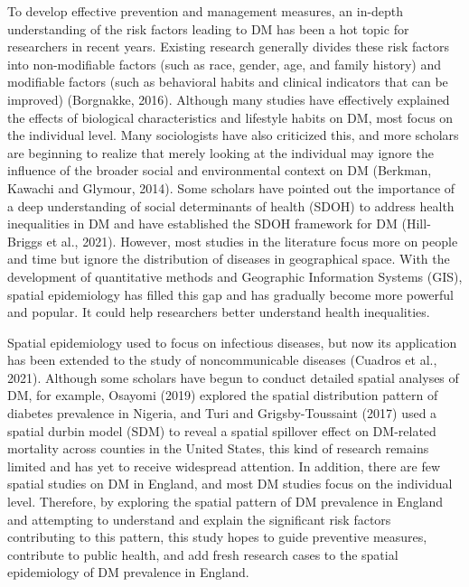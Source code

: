 To develop effective prevention and management measures, an in-depth understanding of the risk factors leading to DM has been a hot topic for researchers in recent years. Existing research generally divides these risk factors into non-modifiable factors (such as race, gender, age, and family history) and modifiable factors (such as behavioral habits and clinical indicators that can be improved) (Borgnakke, 2016). Although many studies have effectively explained the effects of biological characteristics and lifestyle habits on DM, most focus on the individual level. Many sociologists have also criticized this, and more scholars are beginning to realize that merely looking at the individual may ignore the influence of the broader social and environmental context on DM (Berkman, Kawachi and Glymour, 2014). Some scholars have pointed out the importance of a deep understanding of social determinants of health (SDOH) to address health inequalities in DM and have established the SDOH framework for DM (Hill-Briggs et al., 2021). However, most studies in the literature focus more on people and time but ignore the distribution of diseases in geographical space. With the development of quantitative methods and Geographic Information Systems (GIS), spatial epidemiology has filled this gap and has gradually become more powerful and popular. It could help researchers better understand health inequalities.

Spatial epidemiology used to focus on infectious diseases, but now its application has been extended to the study of noncommunicable diseases (Cuadros et al., 2021). Although some scholars have begun to conduct detailed spatial analyses of DM, for example, Osayomi (2019) explored the spatial distribution pattern of diabetes prevalence in Nigeria, and Turi and Grigsby-Toussaint (2017) used a spatial durbin model (SDM) to reveal a spatial spillover effect on DM-related mortality across counties in the United States, this kind of research remains limited and has yet to receive widespread attention. In addition, there are few spatial studies on DM in England, and most DM studies focus on the individual level. Therefore, by exploring the spatial pattern of DM prevalence in England and attempting to understand and explain the significant risk factors contributing to this pattern, this study hopes to guide preventive measures, contribute to public health, and add fresh research cases to the spatial epidemiology of DM prevalence in England.


